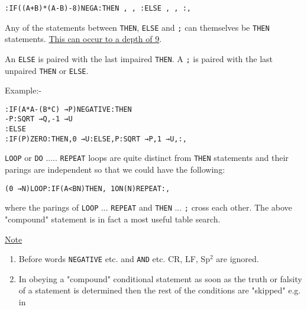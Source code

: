 \documentclass[10pt, a4paper, oneside]{article}
\newcommand{\myuline}[1]{\uline{#1}}
\newcommand{\mytt}[1]{\texttt{\scriptsize #1}}
\newcommand{\mytt}[1]{\texttt{\small #1}}
\begin{document}
\begin{multicols}{2}
\begin{enumerate}
\begin{enumerate}
\begin{addmargin}[0.1cm]{1em}%
\begin{lstlisting}
:IF((A+B)*(A-B)-8)NEGA:THEN , , :ELSE , , :,
\end{lstlisting}
\end{addmargin}

\end{enumerate}

Any of the statements between \mytt{THEN}, \mytt{ELSE} and \mytt{;} can
themselves be \mytt{THEN} statements.  \myuline{This can occur to a
depth of 9}.

An \mytt{ELSE} is paired with the last impaired \mytt{THEN}.
A \mytt{;} is paired with the last unpaired \mytt{THEN} or \mytt{ELSE}.

Example:-

\begin{addmargin}[0.1cm]{1em}%
\begin{lstlisting}
:IF(A*A-(B*C) →P)NEGATIVE:THEN
-P:SQRT →Q,-1 →U
:ELSE
:IF(P)ZERO:THEN,0 →U:ELSE,P:SQRT →P,1 →U,:,
\end{lstlisting}
\end{addmargin}

\mytt{LOOP} or \mytt{DO} ..... \mytt{REPEAT} loops are quite distinct
from \mytt{THEN} statements and their parings are independent
so that we could have the following:

\begin{addmargin}[0.1cm]{1em}%
\begin{lstlisting}
(0 →N)LOOP:IF(A<BN)THEN, 1ON(N)REPEAT:,
\end{lstlisting}
\end{addmargin}

where the parings of \mytt{LOOP} ... \mytt{REPEAT} and \mytt{THEN} ... \mytt{;}
cross each other.  The above "compound" statement is
in fact a most useful table search.

\end{enumerate}

\begin{flushleft}
\myuline{Note}
\end{flushleft}

\begin{enumerate}
\item Before words \mytt{NEGATIVE} etc. and \mytt{AND} etc. CR, LF, Sp$^{2}$
are ignored.
\item In obeying a "compound" conditional statement as
soon as the truth or falsity of a statement is determined
then the rest of the conditions are "skipped" e.g. in


\end{enumerate}
\end{multicols}
\end{document}
